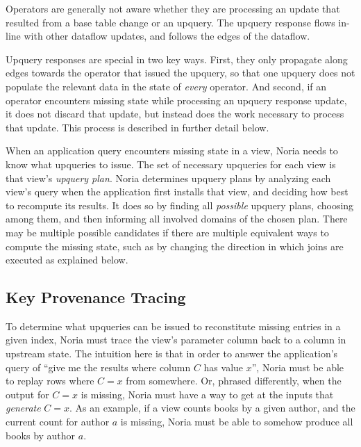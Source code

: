 Operators are generally not aware whether they are processing an update that
resulted from a base table change or an upquery. The upquery response flows
in-line with other dataflow updates, and follows the edges of the dataflow.

Upquery responses are special in two key ways. First, they only propagate along
edges towards the operator that issued the upquery, so that one upquery does not
populate the relevant data in the state of \emph{every} operator. And second,
if an operator encounters missing state while processing an upquery response
update, it does not discard that update, but instead does the work necessary to
process that update. This process is described in further detail below.

When an application query encounters missing state in a view, Noria needs to
know what upqueries to issue. The set of necessary upqueries for each view is
that view's \textit{upquery plan}. Noria determines upquery plans by analyzing
each view's query when the application first installs that view, and deciding
how best to recompute its results. It does so by finding all \emph{possible}
upquery plans, choosing among them, and then informing all involved domains of
the chosen plan. There may be multiple possible candidates if there are multiple
equivalent ways to compute the missing state, such as by changing the direction
in which joins are executed as explained below.

\subsection{Key Provenance Tracing}

To determine what upqueries can be issued to reconstitute missing entries in a
given index, Noria must trace the view's parameter column back to a column in
upstream state. The intuition here is that in order to answer the application's
query of ``give me the results where column $C$ has value $x$'', Noria must be
able to replay rows where $C = x$ from somewhere. Or, phrased differently, when
the output for $C = x$ is missing, Noria must have a way to get at the inputs
that \emph{generate} $C = x$. As an example, if a view counts books by a given
author, and the current count for author $a$ is missing, Noria must be able to
somehow produce all books by author $a$.

